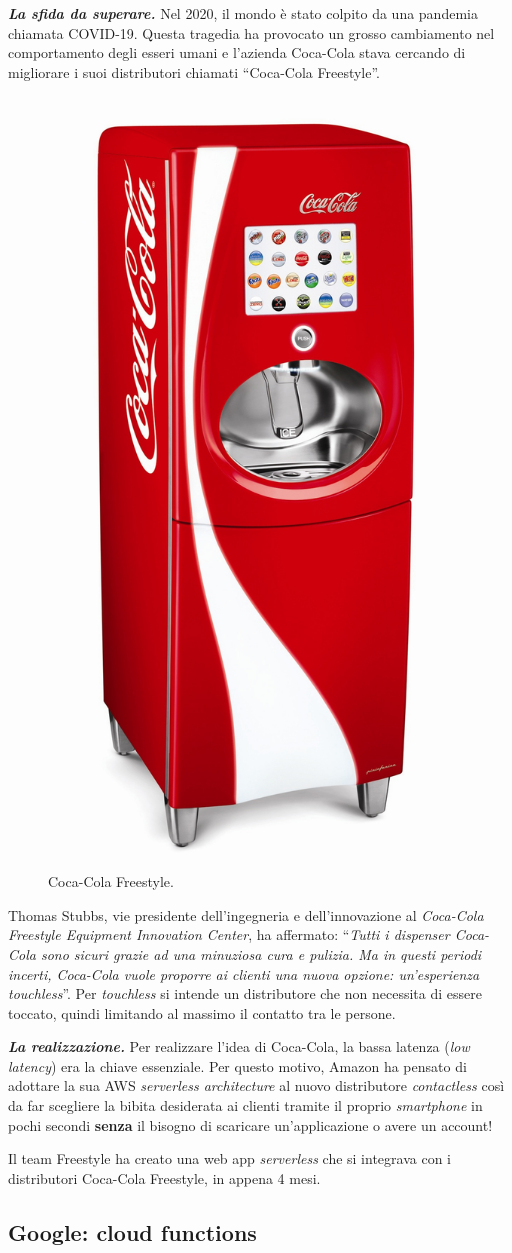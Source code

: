 \documentclass[a4paper]{article}
\newcommand{\dquotes}[1]{``#1''}
\begin{document}
	\noindent
	\textbf{\emph{La sfida da superare.}} Nel 2020, il mondo è stato colpito da una pandemia chiamata COVID-19. Questa tragedia ha provocato un grosso cambiamento nel comportamento degli esseri umani e l'azienda Coca-Cola stava cercando di migliorare i suoi distributori chiamati \dquotes{Coca-Cola Freestyle}.
	\begin{figure}[!htp]
		\centering
		\includegraphics[width=.3\textwidth]{img/Coca-Cola-2.jpg}
		\caption{Coca-Cola Freestyle.}
	\end{figure}
	
	\noindent
	Thomas Stubbs, vie presidente dell'ingegneria e dell'innovazione al \emph{Coca-Cola Freestyle Equipment Innovation Center}, ha affermato: \dquotes{\emph{Tutti i dispenser Coca-Cola sono sicuri grazie ad una minuziosa cura e pulizia. Ma in questi periodi incerti, Coca-Cola vuole proporre ai clienti una nuova opzione: un'esperienza touchless}}. Per \emph{touchless} si intende un distributore che non necessita di essere toccato, quindi limitando al massimo il contatto tra le persone.\newline
	
	\noindent
	\textbf{\emph{La realizzazione.}} Per realizzare l'idea di Coca-Cola, la bassa latenza (\emph{low latency}) era la chiave essenziale. Per questo motivo, Amazon ha pensato di adottare la sua AWS \emph{serverless architecture} al nuovo distributore \emph{contactless} così da far scegliere la bibita desiderata ai clienti tramite il proprio \emph{smartphone} in pochi secondi \textbf{senza} il bisogno di scaricare un'applicazione o avere un account!
	
	Il team Freestyle ha creato una web app \emph{serverless} che si integrava con i distributori Coca-Cola Freestyle, in appena 4 mesi.\newpage
	
	\subsection{Google: cloud functions}
	
\end{document}
